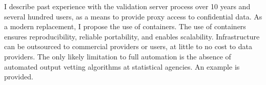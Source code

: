 I describe past experience with the validation server process over 10 years and several hundred users, as a means to provide proxy access to confidential data. As a modern replacement, I propose the use of containers. The use of containers ensures reproducibility, reliable portability, and enables scalability. Infrastructure can be outsourced to commercial providers or users, at little to no cost to data providers. The only likely limitation to full automation is the absence of automated output vetting algorithms at statistical agencies. An example is provided.